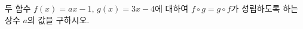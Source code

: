 \hspace*{2mm}\begin{minipage}[t]{\dimexpr\linewidth-2mm\relax}\vspace{0pt}
두 함수 $f(x)=ax-1$, $g(x)=3x-4$에 대하여 $f\circ g=g\circ f$가 성립하도록 하는 상수 $a$의 값을 구하시오.\end{minipage}

